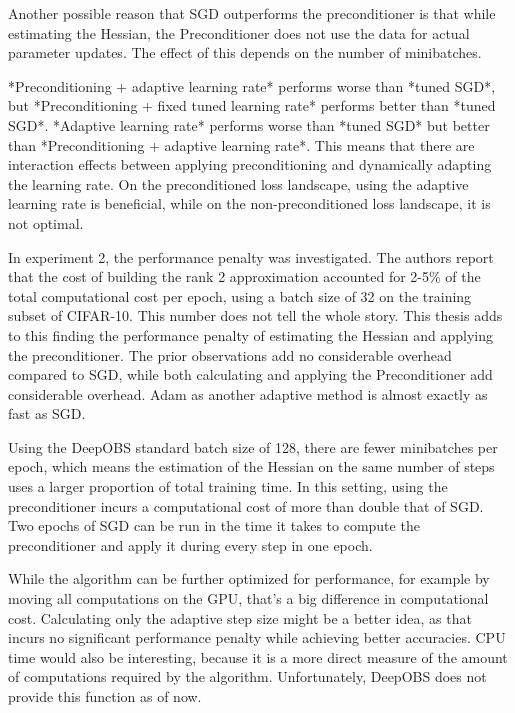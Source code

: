 \documentclass[twoside,12pt,a4paper]{report}
\begin{document}
Another possible reason that SGD outperforms the preconditioner is that while estimating the Hessian, the Preconditioner does not use the data for actual parameter updates. The effect of this depends on the number of minibatches.
\begin{markdown}
*Preconditioning + adaptive learning rate* performs worse than *tuned SGD*, but *Preconditioning + fixed tuned learning rate* performs better than *tuned SGD*. *Adaptive learning rate* performs worse than *tuned SGD* but better than *Preconditioning + adaptive learning rate*. This means that there are interaction effects between applying preconditioning and dynamically adapting the learning rate. On the preconditioned loss landscape, using the adaptive learning rate is beneficial, while on the non-preconditioned loss landscape, it is not optimal.
\end{markdown}

In experiment 2, the performance penalty was investigated. The authors report that the cost of building the rank 2 approximation accounted for 2-5\% of the total computational cost per epoch, using a batch size of 32 on the training subset of CIFAR-10. This number does not tell the whole story. This thesis adds to this finding the performance penalty of estimating the Hessian and applying the preconditioner. The prior observations add no considerable overhead compared to SGD, while both calculating and applying the Preconditioner add considerable overhead. Adam as another adaptive method is almost exactly as fast as SGD.

Using the DeepOBS standard batch size of 128, there are fewer minibatches per epoch, which means the estimation of the Hessian on the same number of steps uses a larger proportion of total training time. In this setting, using the preconditioner incurs a computational cost of more than double that of SGD. Two epochs of SGD can be run in the time it takes to compute the preconditioner and apply it during every step in one epoch.

While the algorithm can be further optimized for performance, for example by moving all computations on the GPU, that's a big difference in computational cost. Calculating only the adaptive step size might be a better idea, as that incurs no significant performance penalty while achieving better accuracies.
CPU time would also be interesting, because it is a more direct measure of the amount of computations required by the algorithm. Unfortunately, DeepOBS does not provide this function as of now.
\end{document}
